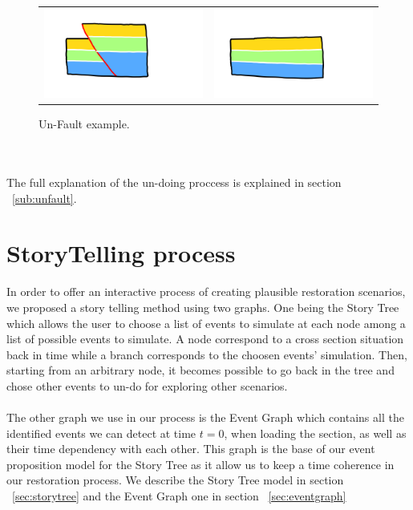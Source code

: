 \documentclass[12pt, a4paper]{report} %
\begin{document}
\begin{figure}[H]
\centering
\begin{tabular}{@{}cc@{}}
\includegraphics[width=.35\textwidth]{unFaultDescription0.png}&
\includegraphics[width=.35\textwidth]{unFaultDescription1.png}\\
\end{tabular}
\caption{Un-Fault example.}
\label{unfaulteg}
\end{figure}\\\\
The full explanation of the un-doing proccess is explained in section ~\ref{sub:unfault}.

\section{StoryTelling process}
\label{sub:storytel}
In order to offer an interactive process of creating plausible restoration scenarios, we proposed a story telling method using two graphs. One being the Story Tree which allows the user to choose a list of events to simulate at each node among a list of possible events to simulate. A node correspond to a cross section situation back in time while a branch corresponds to the choosen events' simulation. Then, starting from an arbitrary node, it becomes possible to go back in the tree and chose other events to un-do for exploring other scenarios.\\\\
The other graph we use in our process is the Event Graph which contains all the identified events we can detect at time $t = 0$, when loading the section, as well as their time dependency with each other. This graph is the base of our event proposition model for the Story Tree as it allow us to keep a time coherence in our restoration process. We describe the Story Tree model in section ~\ref{sec:storytree} and the Event Graph one in section ~\ref{sec:eventgraph}
\end{document}
